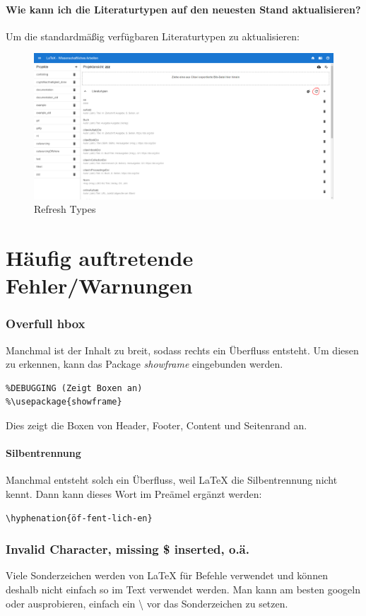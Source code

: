 \documentclass[12pt]{article}
\begin{document}
\subsection{Wie kann ich die Literaturtypen auf den neuesten Stand aktualisieren?}
Um die standardmäßig verfügbaren Literaturtypen zu aktualisieren:
\FloatBarrier
\begin{figure}[!ht]
\includegraphics[width=.9\textwidth]{images/refreshTypes.png}
\caption{Refresh Types}
\end{figure}
\FloatBarrier

\part{Häufig auftretende Fehler/Warnungen}
\section{Overfull hbox}
Manchmal ist der Inhalt zu breit, sodass rechts ein Überfluss entsteht. Um diesen zu erkennen, kann das Package \textit{showframe}  eingebunden werden.
\begin{verbatim}
%DEBUGGING (Zeigt Boxen an)
%\usepackage{showframe}
\end{verbatim}
Dies zeigt die Boxen von Header, Footer, Content und Seitenrand an.
\subsection{Silbentrennung}
Manchmal entsteht solch ein Überfluss, weil LaTeX die Silbentrennung nicht kennt. Dann kann dieses Wort im Preämel ergänzt werden:
\begin{verbatim}
\hyphenation{öf-fent-lich-en}
\end{verbatim}

\section{Invalid Character, missing \$ inserted, o.ä.}
Viele Sonderzeichen werden von LaTeX für Befehle verwendet und können deshalb nicht einfach so im Text verwendet werden. Man kann am besten googeln oder ausprobieren, einfach ein \textbackslash{} vor das Sonderzeichen zu setzen.
\end{document}
